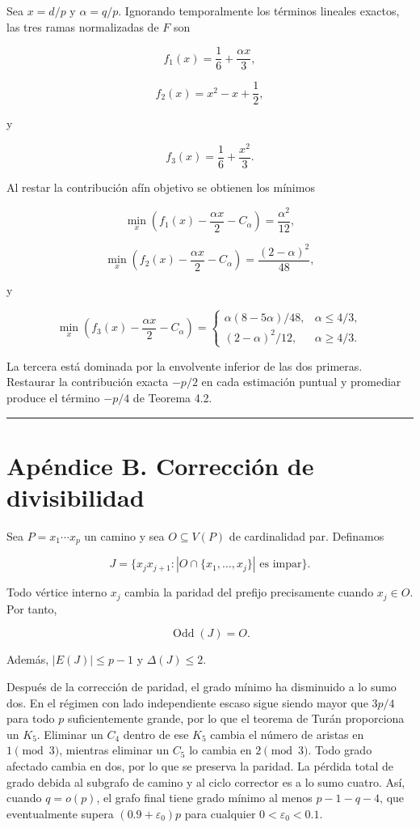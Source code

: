 \documentclass[spanish,11pt,a4paper]{article}
\begin{document}
Sea \(x=d/p\) y \(\alpha=q/p\). Ignorando temporalmente los términos
lineales exactos, las tres ramas normalizadas de \(F\) son

\[
f_1(x)=\frac16+\frac{\alpha x}{3},
\]

\[
f_2(x)=x^2-x+\frac12,
\]

y

\[
f_3(x)=\frac16+\frac{x^2}{3}.
\]

Al restar la contribución afín objetivo se obtienen los mínimos

\[
\min_x\left(f_1(x)-\frac{\alpha x}{2}-C_\alpha\right)
=
\frac{\alpha^2}{12},
\]

\[
\min_x\left(f_2(x)-\frac{\alpha x}{2}-C_\alpha\right)
=
\frac{(2-\alpha)^2}{48},
\]

y

\[
\min_x\left(f_3(x)-\frac{\alpha x}{2}-C_\alpha\right)
=
\begin{cases}
\alpha(8-5\alpha)/48,&\alpha\le4/3,\\
(2-\alpha)^2/12,&\alpha\ge4/3.
\end{cases}
\]

La tercera está dominada por la envolvente inferior de las dos primeras.
Restaurar la contribución exacta \(-p/2\) en cada estimación puntual y
promediar produce el término \(-p/4\) de Teorema 4.2.

\begin{center}\rule{0.5\linewidth}{0.5pt}\end{center}

\section{Apéndice B. Corrección de
divisibilidad}\label{apuxe9ndice-b.-correcciuxf3n-de-divisibilidad}

Sea \(P=x_1\cdots x_p\) un camino y sea \(O\subseteq V(P)\) de
cardinalidad par. Definamos

\[
J=\{x_jx_{j+1}:|O\cap\{x_1,\ldots,x_j\}|\text{ es impar}\}.
\]

Todo vértice interno \(x_j\) cambia la paridad del prefijo precisamente
cuando \(x_j\in O\). Por tanto,

\[
\operatorname{Odd}(J)=O.
\]

Además, \(|E(J)|\le p-1\) y \(\Delta(J)\le2\).

Después de la corrección de paridad, el grado mínimo ha disminuido a lo
sumo dos. En el régimen con lado independiente escaso sigue siendo mayor
que \(3p/4\) para todo \(p\) suficientemente grande, por lo que el
teorema de Turán proporciona un \(K_5\). Eliminar un \(C_4\) dentro de
ese \(K_5\) cambia el número de aristas en \(1\pmod3\), mientras
eliminar un \(C_5\) lo cambia en \(2\pmod3\). Todo grado afectado cambia
en dos, por lo que se preserva la paridad. La pérdida total de grado
debida al subgrafo de camino y al ciclo corrector es a lo sumo cuatro.
Así, cuando \(q=o(p)\), el grafo final tiene grado mínimo al menos
\(p-1-q-4\), que eventualmente supera \((0.9+\varepsilon_0)p\) para
cualquier \(0<\varepsilon_0<0.1\).
\end{document}
